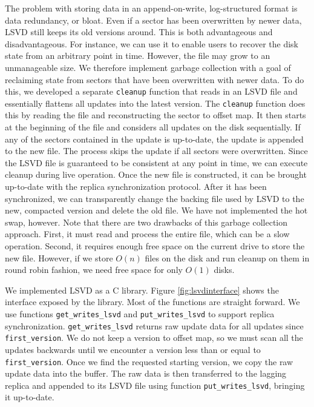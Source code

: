 The problem with storing data in an append-on-write, log-structured format is data redundancy, or bloat. Even if a sector has been overwritten by newer data, LSVD still keeps its old versions around. This is both advantageous and disadvantageous. For instance, we can use it to enable users to recover the disk state from an arbitrary point in time. However, the file may grow to an unmanageable size. We therefore implement garbage collection with a goal of reclaiming state from sectors that have been overwritten with newer data. To do this, we developed a separate \texttt{cleanup} function that reads in an LSVD file and essentially flattens all updates into the latest version. The \texttt{cleanup} function does this by reading the file and reconstructing the sector to offset map. It then starts at the beginning of the file and considers all updates on the disk sequentially. If any of the sectors contained in the update is up-to-date, the update is appended to the new file. The process skips the update if all sectors were overwritten. Since the LSVD file is guaranteed to be consistent at any point in time, we can execute cleanup during live operation. Once the new file is constructed, it can be brought up-to-date with the replica synchronization protocol. After it has been synchronized, we can transparently change the backing file used by LSVD to the new, compacted version and delete the old file. We have not implemented the hot swap, however. Note that there are two drawbacks of this garbage collection approach. First, it must read and process the entire file, which can be a slow operation. Second, it requires enough free space on the current drive to store the new file. However, if we store $O(n)$ files on the disk and run cleanup on them in round robin fashion, we need free space for only $O(1)$ disks. 

We implemented LSVD as a C library. Figure \ref{fig:lsvdinterface} shows the interface exposed by the library. Most of the functions are straight forward. We use functions \texttt{get\_writes\_lsvd} and \texttt{put\_writes\_lsvd} to support replica synchronization. \texttt{get\_writes\_lsvd} returns raw update data for all updates since \texttt{first\_version}. We do not keep a version to offset map, so we must scan all the updates backwards until we encounter a version less than or equal to \texttt{first\_version}. Once we find the requested starting version, we copy the raw update data into the buffer. The raw data is then transferred to the lagging replica and appended to its LSVD file using function \texttt{put\_writes\_lsvd}, bringing it up-to-date.

